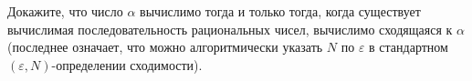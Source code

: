 Докажите, что число $\alpha$ вычислимо тогда и только тогда, когда существует вычислимая
последовательность рациональных чисел, вычислимо сходящаяся к $\alpha$ (последнее означает, что можно
алгоритмически указать $N$ по $\varepsilon$ в стандартном $(\varepsilon, N)$-определении сходимости).
